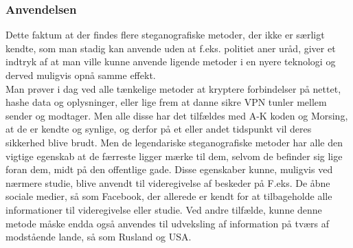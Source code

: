 \subsubsection{Anvendelsen}
Dette faktum at der findes flere steganografiske metoder, der ikke er særligt kendte, som man stadig kan anvende uden at f.eks. politiet aner uråd, giver et indtryk af at man ville kunne anvende ligende metoder i en nyere teknologi og derved muligvis opnå samme effekt. \\
Man prøver i dag ved alle tænkelige metoder at kryptere forbindelser på nettet, hashe data og oplysninger, eller lige frem at danne sikre VPN tunler mellem sender og modtager. Men alle disse har det tilfældes med A-K koden og Morsing, at de er kendte og synlige, og derfor på et eller andet tidspunkt vil deres sikkerhed blive brudt. Men de legendariske steganografiske metoder har alle den vigtige egenskab at de færreste ligger mærke til dem, selvom de befinder sig lige foran dem, midt på den offentlige gade. Disse egenskaber kunne, muligvis ved nærmere studie, blive anvendt til videregivelse af beskeder på F.eks. De åbne sociale medier, så som Facebook, der allerede er kendt for at tilbageholde alle informationer til videregivelse eller studie. Ved andre tilfælde, kunne denne metode måske endda også anvendes til udveksling af information på tværs af modstående lande, så som Rusland og USA.
